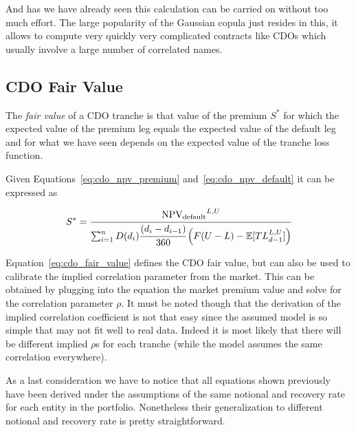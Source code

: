 And has we have already seen this calculation can be carried on without too much effort.
The large popularity of the Gaussian copula just resides in this, it allows to compute very quickly very complicated contracts like CDOs which usually involve a large number of correlated names.

\subsection{CDO Fair Value}
The \emph{fair value} of a CDO tranche is that value of the premium $S^*$ for which the expected value of the premium leg equals the expected value of the default leg and for what we have seen depends on the expected value of the tranche loss function.

Given Equations~\ref{eq:cdo_npv_premium} and~\ref{eq:cdo_npv_default} it can be expressed as

\begin{equation}
S^* = \cfrac{\mathrm{NPV_{default}}^{L,U}}{\sum^{n}_{i=1}D(d_i)\cfrac{(d_i - d_{i-1})}{360}\left(F(U-L)-\mathbb{E}[TL_{d-1}^{L,U}]\right)}
\label{eq:cdo_fair_value}
\end{equation}

Equation~\ref{eq:cdo_fair_value} defines the CDO fair value, but can also be used to calibrate the implied correlation parameter from the market.
This can be obtained by plugging into the equation the market premium value and solve for the correlation parameter $\rho$.
It must be noted though that the derivation of the implied correlation coefficient is not that easy since the assumed model is so simple that may not fit well to real data. Indeed it is most likely that there will be different implied $\rho$s for each tranche (while the model assumes the same correlation everywhere).

As a last consideration we have to notice that all equations shown previously have been derived under the assumptions of the same notional and recovery rate for each entity in the portfolio. Nonetheless their generalization to different notional and recovery rate is pretty straightforward.
 
%

